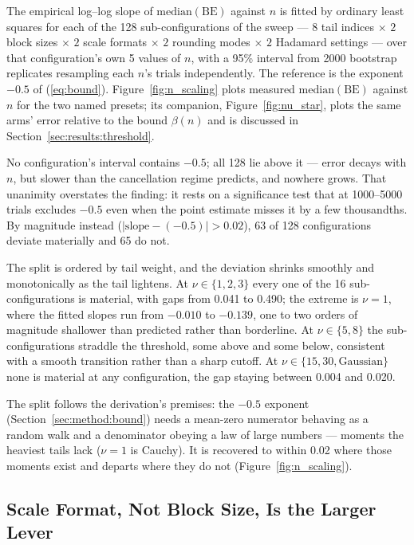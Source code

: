 The empirical log--log slope of $\mathrm{median}(\mathrm{BE})$ against $n$ is
fitted by ordinary least squares for each of the 128 sub-configurations of the
sweep --- $8$ tail indices $\times$ $2$ block sizes $\times$ $2$ scale formats
$\times$ $2$ rounding modes $\times$ $2$ Hadamard settings --- over that
configuration's own 5 values of $n$, with a 95\% interval from 2000 bootstrap
replicates resampling each $n$'s trials independently. The reference is the
exponent $-0.5$ of (\ref{eq:bound}). Figure~\ref{fig:n_scaling} plots measured
$\mathrm{median}(\mathrm{BE})$ against $n$ for the two named presets; its
companion, Figure~\ref{fig:nu_star}, plots the same arms' error relative to the
bound $\beta(n)$ and is discussed in Section~\ref{sec:results:threshold}.

No configuration's interval contains $-0.5$; all 128 lie above it --- error
decays with $n$, but slower than the cancellation regime predicts, and nowhere
grows. That unanimity overstates the finding: it rests on a significance test
that at 1000--5000 trials excludes $-0.5$ even when the point estimate misses it
by a few thousandths. By magnitude instead ($|\mathrm{slope} - (-0.5)| > 0.02$), 63 of 128
configurations deviate materially and 65 do not.

The split is ordered by tail weight, and the deviation shrinks smoothly and
monotonically as the tail lightens. At $\nu \in \{1, 2, 3\}$ every one of the 16
sub-configurations is material, with gaps from 0.041 to 0.490; the extreme is
$\nu = 1$, where the fitted slopes run from $-0.010$ to $-0.139$, one to two
orders of magnitude shallower than predicted rather than borderline. At
$\nu \in \{5, 8\}$ the sub-configurations straddle the threshold, some above and
some below, consistent with a smooth transition rather than a sharp cutoff. At
$\nu \in \{15, 30, \mathrm{Gaussian}\}$ none is material at any configuration, the
gap staying between 0.004 and 0.020.

The split follows the derivation's premises: the $-0.5$ exponent
(Section~\ref{sec:method:bound}) needs a mean-zero numerator behaving as a random
walk and a denominator obeying a law of large numbers --- moments the heaviest
tails lack ($\nu = 1$ is Cauchy). It is recovered to within 0.02 where those
moments exist and departs where they do not (Figure~\ref{fig:n_scaling}).

\subsection{Scale Format, Not Block Size, Is the Larger Lever}
\label{sec:results:decomposition}

